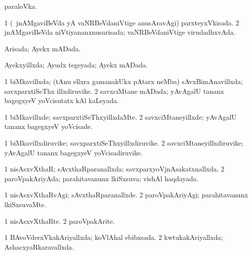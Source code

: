{{\noindent 
\gl{\pagu}
\expl{}
\bmng
{} paraloVka. 
\emng
\eentry

\bentry
{} 
\gl{\gu}
\expl{}
\bmng
\bnum
\num{1} (\kanmu\ jnAMgaviBeVda yA vaNRBeVdaniVtige anusAravAgi) parxteyxVkisada. 
\num{2} jnAMgaviBeVda niVtiyananxnusarisada; vaNRBeVdaniVtige virudadhxvAda. 
\enum
\emng
\eentry

\bentry
{} 
\gl{\gu}
\expl{}
\bmng
Arisada; Ayekx mADada. 
\emng
\eentry

\bentry
{} 
\gl{\gu}
\expl{}
\bmng
Ayekxyillxda; Ayudx tegeyada; Ayekx mADada. 
\emng
\eentry

\bentry
{} 
\gl{\gu}
\expl{}
\bmng
\bnum
\num{1} biMkavillxda; (tAnu ellxra gamanakUkx pAtarx neMba) sAvxBimAnavillxda; savxparxtiSeThx illxdiruvike. 
\num{2} savxciMtane mADada; yAvAgalU tananx bagegxyeV yoVcisutatx kAl kaLeyada. 
\enum
\emng
\eentry

\bentry
{} 
\gl{\kirxvi}
\bmng
\bnum
\num{1} biMkavillxde; savxparxtiSeThxyillxdaMte. 
\num{2} savxciMtaneyillxde; yAvAgalU tananx bagegxyeV yoVcisade. 
\enum
\emng
\eentry

\bentry
{} 
\gl{\nA}
\expl{}
\bmng
\bnum
\num{1} biMkavillxdiruvike; savxparxtiSeThxyillxdiruvike. 
\num{2} savxciMtaneyillxdiruvike; yAvAgalU tananx bagegxyeV yoVcisadiruvike. 
\enum
\emng
\eentry

\bentry
{} 
\gl{\gu}
\expl{}
\bmng
\bnum
\num{1} nisAsxvXthaR; sAvxthaRparanallxda; savxparxyoVjnAsakatxnallxda. 
\num{2} paroVpakAriyAda; parahitavanunx lkiSxsuva; vishAl haqdayada. 
\enum
\emng
\eentry

\bentry
{} 
\gl{\kirxvi}
\bmng
\bnum
\num{1} nisAsxvXthaRvAgi; sAvxthaRparanallxde. 
\num{2} paroVpakAriyAgi; parahitavanunx lkiSxsuvaMte. 
\enum
\emng
\eentry

\bentry
{} 
\gl{\nA}
\expl{}
\bmng
\bnum
\num{1} nisAsxvXthaRte. 
\num{2} paroVpakArite. 
\enum
\emng
\eentry

\bentry
{} 
\gl{\gu}
\expl{}
\bmng
\bnum
\num{1} BAvoVderxVkakAriyallxda; koVlAhal ebibxsada. 
\num{2} kwtukakAriyallxda; AshacxyaRkaravallxda. 
\enum
\emng
\eentry

}}
